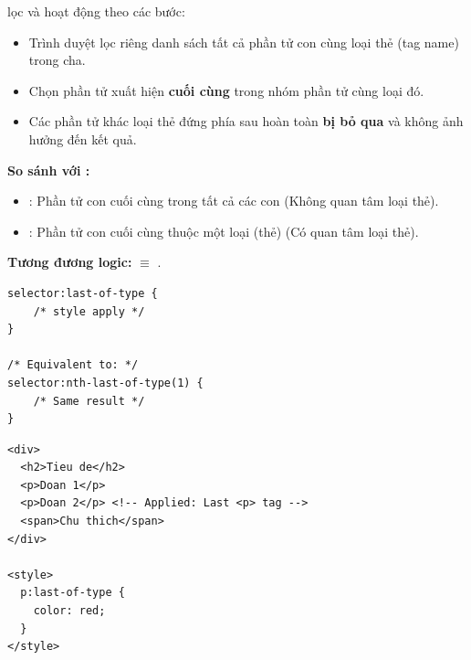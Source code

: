 \begin{conceptBox}
 lọc và hoạt động theo các bước:
\begin{itemize}[leftmargin=1.5em, itemsep=2pt, parsep=0pt]
    \item Trình duyệt lọc riêng danh sách tất cả phần tử con cùng loại thẻ (tag name) trong cha.
    \item Chọn phần tử xuất hiện \textbf{cuối cùng} trong nhóm phần tử cùng loại đó.
    \item Các phần tử khác loại thẻ đứng phía sau hoàn toàn \textbf{bị bỏ qua} và không ảnh hưởng đến kết quả.
\end{itemize}
\par\vspace{4pt}
\textbf{So sánh với :}
\begin{itemize}[leftmargin=1.5em, itemsep=2pt, parsep=0pt]
    \item {}: Phần tử con cuối cùng trong tất cả các con (Không quan tâm loại thẻ).
    \item {}: Phần tử con cuối cùng thuộc một loại (thẻ) (Có quan tâm loại thẻ).
\end{itemize}
\par\vspace{4pt}
\textbf{Tương đương logic:}  $\equiv$ .
\end{conceptBox}

\begin{codeWindow}
\begin{lstlisting}[language=CSS3]
selector:last-of-type {
    /* style apply */
}

/* Equivalent to: */
selector:nth-last-of-type(1) {
    /* Same result */
}
\end{lstlisting}
\end{codeWindow}

\begin{codeWindow}
\begin{lstlisting}[language=HTML5]
<div>
  <h2>Tieu de</h2>
  <p>Doan 1</p>
  <p>Doan 2</p> <!-- Applied: Last <p> tag -->
  <span>Chu thich</span>
</div>

<style>
  p:last-of-type {
    color: red;
  }
</style>
\end{lstlisting}
\end{codeWindow}

